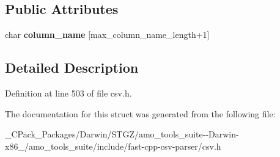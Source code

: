 \subsection*{Public Attributes}
\begin{DoxyCompactItemize}
\item 
\mbox{\label{structio_1_1error_1_1with__column__name_a9868abf734aff1cd3cc5466e7c361a7f}} 
char {\bfseries column\+\_\+name} \mbox{[}max\+\_\+column\+\_\+name\+\_\+length+1\mbox{]}
\end{DoxyCompactItemize}


\subsection{Detailed Description}


Definition at line 503 of file csv.\+h.



The documentation for this struct was generated from the following file\+:\begin{DoxyCompactItemize}
\item 
\+\_\+\+C\+Pack\+\_\+\+Packages/\+Darwin/\+S\+T\+G\+Z/amo\+\_\+tools\+\_\+suite-\/-\/\+Darwin-\/x86\+\_/amo\+\_\+tools\+\_\+suite/include/fast-\/cpp-\/csv-\/parser/csv.\+h\end{DoxyCompactItemize}
